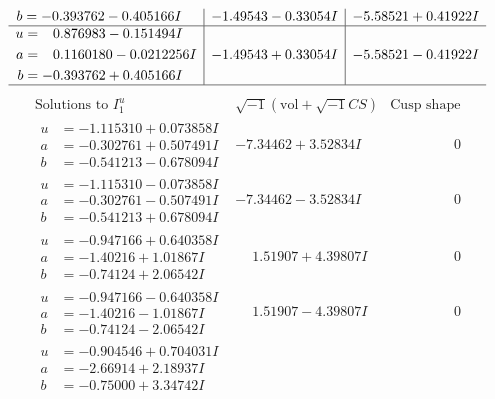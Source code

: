 \documentclass[1p]{elsarticle_modified}
\theoremstyle{definition}
\newcommand{\I}{\sqrt{-1}}
\begin{document}
$$\begin{array}{c|c|c}
\begin{aligned}
b &= -0.393762 - 0.405166 I\end{aligned}
 & -1.49543 - 0.33054 I & -5.58521 + 0.41922 I \\ \hline\begin{aligned}
u &= \phantom{-}0.876983 - 0.151494 I \\
a &= \phantom{-}0.1160180 - 0.0212256 I \\
b &= -0.393762 + 0.405166 I\end{aligned}
 & -1.49543 + 0.33054 I & -5.58521 - 0.41922 I\\
 \hline 
 \end{array}$$\newpage$$\begin{array}{c|c|c}  
\text{Solutions to }I^u_{1}& \I (\text{vol} + \sqrt{-1}CS) & \text{Cusp shape}\\
 \hline 
\begin{aligned}
u &= -1.115310 + 0.073858 I \\
a &= -0.302761 + 0.507491 I \\
b &= -0.541213 - 0.678094 I\end{aligned}
 & -7.34462 + 3.52834 I & \phantom{-0.000000 } 0 \\ \hline\begin{aligned}
u &= -1.115310 - 0.073858 I \\
a &= -0.302761 - 0.507491 I \\
b &= -0.541213 + 0.678094 I\end{aligned}
 & -7.34462 - 3.52834 I & \phantom{-0.000000 } 0 \\ \hline\begin{aligned}
u &= -0.947166 + 0.640358 I \\
a &= -1.40216 + 1.01867 I \\
b &= -0.74124 + 2.06542 I\end{aligned}
 & \phantom{-}1.51907 + 4.39807 I & \phantom{-0.000000 } 0 \\ \hline\begin{aligned}
u &= -0.947166 - 0.640358 I \\
a &= -1.40216 - 1.01867 I \\
b &= -0.74124 - 2.06542 I\end{aligned}
 & \phantom{-}1.51907 - 4.39807 I & \phantom{-0.000000 } 0 \\ \hline\begin{aligned}
u &= -0.904546 + 0.704031 I \\
a &= -2.66914 + 2.18937 I \\
b &= -0.75000 + 3.34742 I\end{aligned}

\end{array}$$
\end{document}
